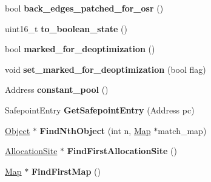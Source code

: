 \begin{DoxyCompactItemize}
\item 
bool {\bfseries back\+\_\+edges\+\_\+patched\+\_\+for\+\_\+osr} ()\hypertarget{classv8_1_1internal_1_1_code_ae1edf47fbb5a89705b2630d2d37870ba}{}\label{classv8_1_1internal_1_1_code_ae1edf47fbb5a89705b2630d2d37870ba}

\item 
uint16\+\_\+t {\bfseries to\+\_\+boolean\+\_\+state} ()\hypertarget{classv8_1_1internal_1_1_code_acd5ee997585272cefdbc7162e4d81b32}{}\label{classv8_1_1internal_1_1_code_acd5ee997585272cefdbc7162e4d81b32}

\item 
bool {\bfseries marked\+\_\+for\+\_\+deoptimization} ()\hypertarget{classv8_1_1internal_1_1_code_a5d277000c4f328977af13b188359678b}{}\label{classv8_1_1internal_1_1_code_a5d277000c4f328977af13b188359678b}

\item 
void {\bfseries set\+\_\+marked\+\_\+for\+\_\+deoptimization} (bool flag)\hypertarget{classv8_1_1internal_1_1_code_ab2986a526209fffee3cb7dd6d23aed60}{}\label{classv8_1_1internal_1_1_code_ab2986a526209fffee3cb7dd6d23aed60}

\item 
Address {\bfseries constant\+\_\+pool} ()\hypertarget{classv8_1_1internal_1_1_code_a5f04e3b72f49d3d9b4ebfd45b3226d07}{}\label{classv8_1_1internal_1_1_code_a5f04e3b72f49d3d9b4ebfd45b3226d07}

\item 
Safepoint\+Entry {\bfseries Get\+Safepoint\+Entry} (Address pc)\hypertarget{classv8_1_1internal_1_1_code_a90570278867fd86303764b8551e6d1e6}{}\label{classv8_1_1internal_1_1_code_a90570278867fd86303764b8551e6d1e6}

\item 
\hyperlink{classv8_1_1internal_1_1_object}{Object} $\ast$ {\bfseries Find\+Nth\+Object} (int n, \hyperlink{classv8_1_1internal_1_1_map}{Map} $\ast$match\+\_\+map)\hypertarget{classv8_1_1internal_1_1_code_a5e0663f404057d09ffbef8875e9efa06}{}\label{classv8_1_1internal_1_1_code_a5e0663f404057d09ffbef8875e9efa06}

\item 
\hyperlink{classv8_1_1internal_1_1_allocation_site}{Allocation\+Site} $\ast$ {\bfseries Find\+First\+Allocation\+Site} ()\hypertarget{classv8_1_1internal_1_1_code_a08c716827bc2aa2dda5c123a898d2745}{}\label{classv8_1_1internal_1_1_code_a08c716827bc2aa2dda5c123a898d2745}

\item 
\hyperlink{classv8_1_1internal_1_1_map}{Map} $\ast$ {\bfseries Find\+First\+Map} ()\hypertarget{classv8_1_1internal_1_1_code_a25056a97d5912e64fc8af544e212abe6}{}\label{classv8_1_1internal_1_1_code_a25056a97d5912e64fc8af544e212abe6}


\end{DoxyCompactItemize}
